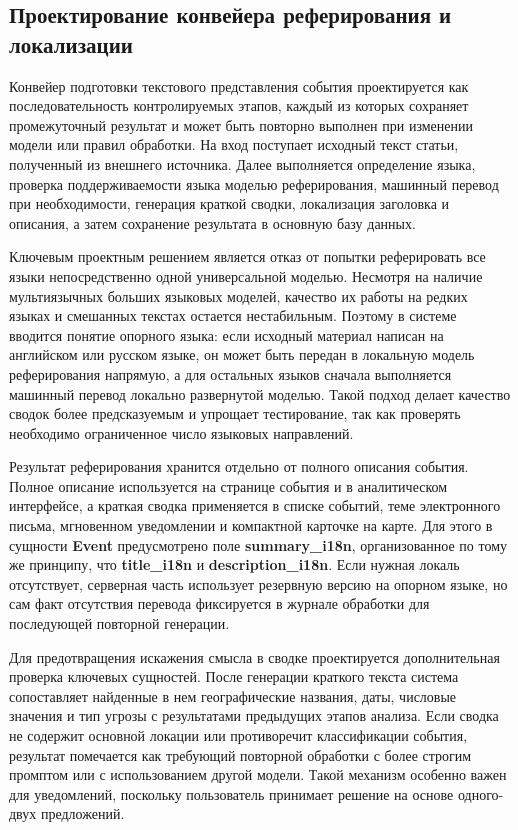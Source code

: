 \subsection{Проектирование конвейера реферирования и локализации}

Конвейер подготовки текстового представления события проектируется как последовательность контролируемых этапов, каждый из которых сохраняет промежуточный результат и может быть повторно выполнен при изменении модели или правил обработки. На вход поступает исходный текст статьи, полученный из внешнего источника. Далее выполняется определение языка, проверка поддерживаемости языка моделью реферирования, машинный перевод при необходимости, генерация краткой сводки, локализация заголовка и описания, а затем сохранение результата в основную базу данных.

Ключевым проектным решением является отказ от попытки реферировать все языки непосредственно одной универсальной моделью. Несмотря на наличие мультиязычных больших языковых моделей, качество их работы на редких языках и смешанных текстах остается нестабильным. Поэтому в системе вводится понятие опорного языка: если исходный материал написан на английском или русском языке, он может быть передан в локальную модель реферирования напрямую, а для остальных языков сначала выполняется машинный перевод локально развернутой моделью. Такой подход делает качество сводок более предсказуемым и упрощает тестирование, так как проверять необходимо ограниченное число языковых направлений.

Результат реферирования хранится отдельно от полного описания события. Полное описание используется на странице события и в аналитическом интерфейсе, а краткая сводка применяется в списке событий, теме электронного письма, мгновенном уведомлении и компактной карточке на карте. Для этого в сущности \textbf{Event} предусмотрено поле \textbf{summary\_i18n}, организованное по тому же принципу, что \textbf{title\_i18n} и \textbf{description\_i18n}. Если нужная локаль отсутствует, серверная часть использует резервную версию на опорном языке, но сам факт отсутствия перевода фиксируется в журнале обработки для последующей повторной генерации.

Для предотвращения искажения смысла в сводке проектируется дополнительная проверка ключевых сущностей. После генерации краткого текста система сопоставляет найденные в нем географические названия, даты, числовые значения и тип угрозы с результатами предыдущих этапов анализа. Если сводка не содержит основной локации или противоречит классификации события, результат помечается как требующий повторной обработки с более строгим промптом или с использованием другой модели. Такой механизм особенно важен для уведомлений, поскольку пользователь принимает решение на основе одного-двух предложений.

